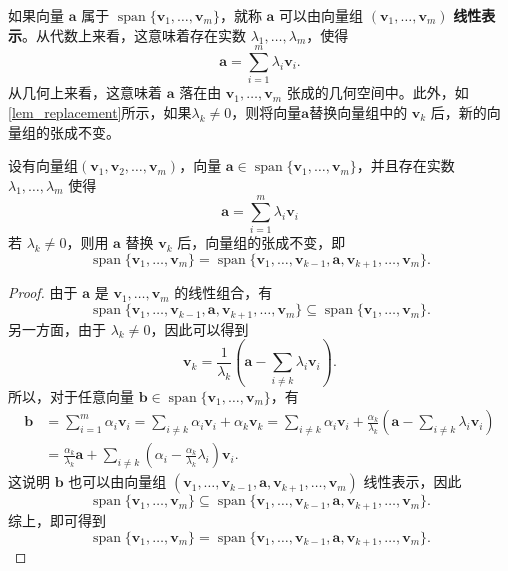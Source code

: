 如果向量 \(\bm a\) 属于 \(\operatorname{span}\{\bm v_1,\ldots,\bm v_m\}\)，就称 \(\bm a\) 可以由向量组 \((\bm v_1,\ldots,\bm v_m)\) \textbf{线性表示}。从代数上来看，这意味着存在实数 \(\lambda_1,\ldots,\lambda_m\)，使得
\[
    \bm a=\sum_{i=1}^{m}\lambda_i\bm v_i.
\]
从几何上来看，这意味着 \(\bm a\) 落在由 \(\bm v_1,\ldots,\bm v_m\) 张成的几何空间中。此外，如\cref{lem_replacement}所示，如果\( \lambda_k \neq 0 \)，则将向量\( \bm{a} \)替换向量组中的 \( \bm{v}_k \) 后，新的向量组的张成不变。
\begin{lemma}[替换引理]
    \label{lem_replacement}
    设有向量组\((\bm{v}_1, \bm{v}_2, \ldots, \bm{v}_m) \)，向量 \(\bm a \in \operatorname{span}\{\bm v_1,\ldots,\bm v_m\}\)，并且存在实数 \(\lambda_1,\ldots,\lambda_m\) 使得
    \[
        \bm a=\sum_{i=1}^{m}\lambda_i\bm v_i
    \]
    若 \(\lambda_k\ne0\)，则用 \(\bm a\) 替换 \(\bm v_k\) 后，向量组的张成不变，即
    \[
        \operatorname{span}
        \{\bm v_1,\ldots,\bm v_m\}
        =
        \operatorname{span}
        \{\bm v_1,\ldots,\bm v_{k-1},
        \bm a,\bm v_{k+1},\ldots,\bm v_m\}.
    \]
\end{lemma}
\begin{proof}
    由于 \(\bm a\) 是 \(\bm v_1,\ldots,\bm v_m\) 的线性组合，有
    \[
        \operatorname{span}
        \{\bm v_1,\ldots,\bm v_{k-1},
        \bm a,\bm v_{k+1},\ldots,\bm v_m\}
        \subseteq
        \operatorname{span}
        \{\bm v_1,\ldots,\bm v_m\}.
    \]
    另一方面，由于 \(\lambda_k\ne0\)，因此可以得到
    \[
        \bm v_k
        =\frac{1}{\lambda_k}
        \left(
        \bm a-\sum_{i\ne k}\lambda_i\bm v_i
        \right).
    \]
    所以，对于任意向量 \(\bm b\in\operatorname{span}\{\bm v_1,\ldots,\bm v_m\}\)，有
    \[
        \begin{split}
            \bm b & =\sum_{i=1}^{m}\alpha_i\bm v_i
            =\sum_{i\ne k}\alpha_i\bm v_i+\alpha_k\bm v_k
            =\sum_{i\ne k}\alpha_i\bm v_i+\frac{\alpha_k}{\lambda_k} \left( \bm a-\sum_{i\ne k}\lambda_i\bm v_i \right)              \\
                  & =\frac{\alpha_k}{\lambda_k}\bm a +\sum_{i\ne k}\left(\alpha_i-\frac{\alpha_k}{\lambda_k}\lambda_i\right)\bm v_i.
        \end{split}
    \]
    这说明 \(\bm b\) 也可以由向量组 \((\bm v_1,\ldots,\bm v_{k-1},\bm a,\bm v_{k+1},\ldots,\bm v_m)\) 线性表示，因此
    \[
        \operatorname{span}
        \{\bm v_1,\ldots,\bm v_m\}
        \subseteq
        \operatorname{span}
        \{\bm v_1,\ldots,\bm v_{k-1},
        \bm a,\bm v_{k+1},\ldots,\bm v_m\}.
    \]
    综上，即可得到
    \[
        \operatorname{span}
        \{\bm v_1,\ldots,\bm v_m\}
        =
        \operatorname{span}
        \{\bm v_1,\ldots,\bm v_{k-1},
        \bm a,\bm v_{k+1},\ldots,\bm v_m\}.
    \]
\end{proof}


